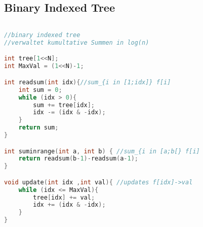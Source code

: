 \subsection{Binary Indexed Tree}
\begin{lstlisting}[language=C++]
  
//binary indexed tree
//verwaltet kumultative Summen in log(n)

int tree[1<<N];
int MaxVal = (1<<N)-1;

int readsum(int idx){//sum_{i in [1;idx]} f[i]
	int sum = 0;
	while (idx > 0){
		sum += tree[idx];
		idx -= (idx & -idx);
	}
	return sum;
}

int suminrange(int a, int b) { //sum_{i in [a;b[} f[i]
	return readsum(b-1)-readsum(a-1);
}

void update(int idx ,int val){ //updates f[idx]->val
	while (idx <= MaxVal){
		tree[idx] += val;
		idx += (idx & -idx);
	}
}
\end{lstlisting}

